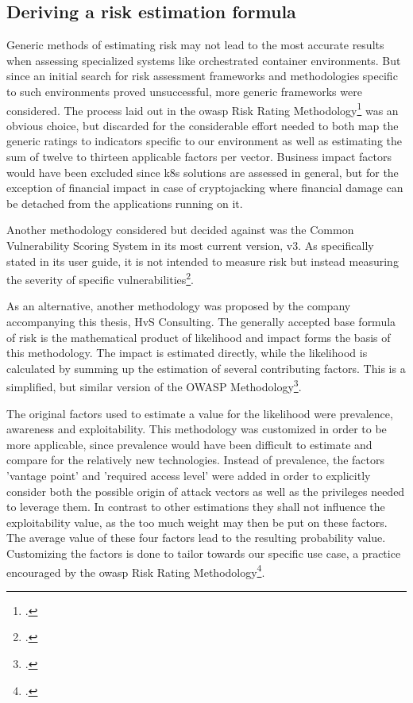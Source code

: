 \subsection{Deriving a risk estimation formula}
Generic methods of estimating risk may not lead to the most accurate results when assessing specialized systems like orchestrated container environments.
But since an initial search for risk assessment frameworks and methodologies specific to such environments proved unsuccessful, more generic frameworks were considered. 
The process laid out in the \gls{owasp} Risk Rating Methodology\footcite[][, sections 'Step 2' to 'Step 4' ]{riskRating} was an obvious choice, but discarded for the considerable effort needed to both map the generic ratings to indicators specific to our environment as well as estimating the sum of twelve to thirteen applicable factors per vector. Business impact factors would have been excluded since \gls{k8s} solutions are assessed in general, but for the exception of financial impact in case of cryptojacking where financial damage can be detached from the applications running on it.

Another methodology considered but decided against was the Common Vulnerability Scoring System in its most current version, v3. As specifically stated in its user guide, it is not intended to measure risk but instead measuring the severity of specific vulnerabilities\footcite[][, section '2.1. CVSS Measures Severity, not Risk']{cvssUserGuide}.

As an alternative, another methodology was proposed by the company accompanying this thesis, HvS Consulting. The generally accepted base formula of risk is the mathematical product of likelihood and impact forms the basis of this methodology. The impact is estimated directly, while the likelihood is calculated by summing up the estimation of several contributing factors. This is a simplified, but similar version of the OWASP Methodology\footcite[][, section 'Step 4: Determining the Severity of the Risk']{riskRating}. 

The original factors used to estimate a value for the likelihood were prevalence, awareness and exploitability. This methodology was customized in order to be more applicable, since prevalence would have been difficult to estimate and compare for the relatively new technologies. Instead of prevalence, the factors 'vantage point' and 'required access level' were added in order to explicitly consider both the possible origin of attack vectors as well as the privileges needed to leverage them. In contrast to other estimations they shall not influence the exploitability value, as the too much weight may then be put on these factors. The average value of these four factors lead to the resulting probability value. Customizing the factors is done to tailor towards our specific use case, a practice encouraged by the \gls{owasp} Risk Rating Methodology\footcite[][, section 'Step 6: Customizing the Risk Rating Model']{riskRating}.

